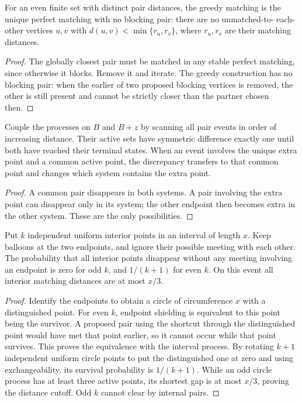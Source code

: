\documentclass[11pt,letterpaper]{article}
\begin{document}
\begin{lemma}\label{lem:stable}
For an even finite set with distinct pair distances, the greedy matching is
the unique perfect matching with no blocking pair: there are no unmatched-to-
each-other vertices $u,v$ with
$d(u,v)<\min\{r_u,r_v\}$, where $r_u,r_v$ are their matching distances.
\end{lemma}
\begin{proof}
The globally closest pair must be matched in any stable perfect matching,
since otherwise it blocks. Remove it and iterate. The greedy construction
has no blocking pair: when the earlier of two proposed blocking vertices
is removed, the other is still present and cannot be strictly closer than
the partner chosen then.
\end{proof}

\begin{lemma}\label{lem:discrepancy}
Couple the processes on $B$ and $B+z$ by scanning all pair events in order
of increasing distance. Their active sets have symmetric difference exactly
one until both have reached their terminal states. When an event involves
the unique extra point and a common active point, the discrepancy transfers
to that common point and changes which system contains the extra point.
\end{lemma}
\begin{proof}
A common pair disappears in both systems. A pair involving the extra point
can disappear only in its system; the other endpoint then becomes extra in
the other system. These are the only possibilities.
\end{proof}

\begin{lemma}\label{lem:shield}
Put $k$ independent uniform interior points in an interval of length $x$.
Keep balloons at the two endpoints, and ignore their possible meeting with
each other. The probability that all interior points disappear without any
meeting involving an endpoint is zero for odd $k$, and $1/(k+1)$ for even
$k$. On this event all interior matching distances are at most $x/3$.
\end{lemma}
\begin{proof}
Identify the endpoints to obtain a circle of circumference $x$ with a
distinguished point. For even $k$, endpoint shielding is equivalent to this
point being the survivor. A proposed pair using the shortcut through the
distinguished point would have met that point earlier, so it cannot occur
while that point survives. This proves the equivalence with the interval
process. By rotating $k+1$ independent uniform circle points to put the
distinguished one at zero and using exchangeability, its survival probability
is $1/(k+1)$. While an odd circle process has at least three active points,
its shortest gap is at most $x/3$, proving the distance cutoff. Odd $k$
cannot clear by internal pairs.
\end{proof}
\end{document}
